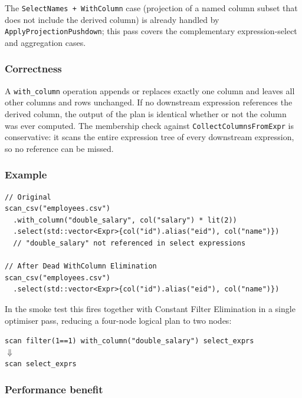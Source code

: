 \documentclass[12pt,a4paper]{article}
\begin{document}
The \texttt{SelectNames\,+\,WithColumn} case (projection of a named column
subset that does not include the derived column) is already handled by
\texttt{ApplyProjectionPushdown}; this pass covers the complementary
expression-select and aggregation cases.

\subsubsection*{Correctness}

A \texttt{with\_column} operation appends or replaces exactly one column
and leaves all other columns and rows unchanged.  If no downstream
expression references the derived column, the output of the plan is
identical whether or not the column was ever computed.  The membership
check against \texttt{CollectColumnsFromExpr} is conservative: it scans
the entire expression tree of every downstream expression, so no
reference can be missed.

\subsubsection*{Example}

\begin{lstlisting}
// Original
scan_csv("employees.csv")
  .with_column("double_salary", col("salary") * lit(2))
  .select(std::vector<Expr>{col("id").alias("eid"), col("name")})
  // "double_salary" not referenced in select expressions

// After Dead WithColumn Elimination
scan_csv("employees.csv")
  .select(std::vector<Expr>{col("id").alias("eid"), col("name")})
\end{lstlisting}

In the smoke test this fires together with Constant Filter Elimination in a
single optimiser pass, reducing a four-node logical plan to two nodes:

\begin{center}
\texttt{scan \textrightarrow{} filter(1==1) \textrightarrow{} with\_column("double\_salary") \textrightarrow{} select\_exprs}
\\[0.3em]
$\Downarrow$
\\[0.3em]
\texttt{scan \textrightarrow{} select\_exprs}
\end{center}

\subsubsection*{Performance benefit}
\end{document}
